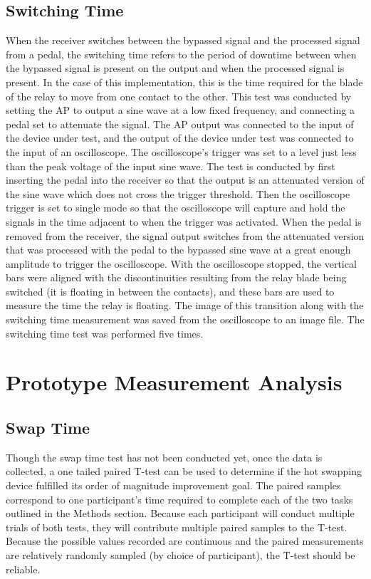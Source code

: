 \documentclass{article}
\begin{document}
	\subsection{Switching Time}
	When the receiver switches between the bypassed signal and the processed signal from a pedal, the switching time refers to the period of downtime between when the bypassed signal is present on the output and when the processed signal is present.  In the case of this implementation, this is the time required for the blade of the relay to move from one contact to the other.  This test was conducted by setting the AP to output a sine wave at a low fixed frequency, and connecting a pedal set to attenuate the signal.  The AP output was connected to the input of the device under test, and the output of the device under test was connected to the input of an oscilloscope.  The oscilloscope's trigger was set to a level just less than the peak voltage of the input sine wave.  The test is conducted by first inserting the pedal into the receiver so that the output is an attenuated version of the sine wave which does not cross the trigger threshold.  Then the oscilloscope trigger is set to single mode so that the oscilloscope will capture and hold the signals in the time adjacent to when the trigger was activated.  When the pedal is removed from the receiver, the signal output switches from the attenuated version that was processed with the pedal to the bypassed sine wave at a great enough amplitude to trigger the oscilloscope.  With the oscilloscope stopped, the vertical bars were aligned with the discontinuities resulting from the relay blade being switched (it is floating in between the contacts), and these bars are used to measure the time the relay is floating.  The image of this transition along with the switching time measurement was saved from the oscilloscope to an image file.  The switching time test was performed five times.

\section{Prototype Measurement Analysis}
	\subsection{Swap Time}
	Though the swap time test has not been conducted yet, once the data is collected, a one tailed paired T-test can be used to determine if the hot swapping device fulfilled its order of magnitude improvement goal.  The paired samples correspond to one participant's time required to complete each of the two tasks outlined in the Methods section.  Because each participant will conduct multiple trials of both tests, they will contribute multiple paired samples to the T-test.  Because the possible values recorded are continuous and the paired measurements are relatively randomly sampled (by choice of participant), the T-test should be reliable.
\end{document}
